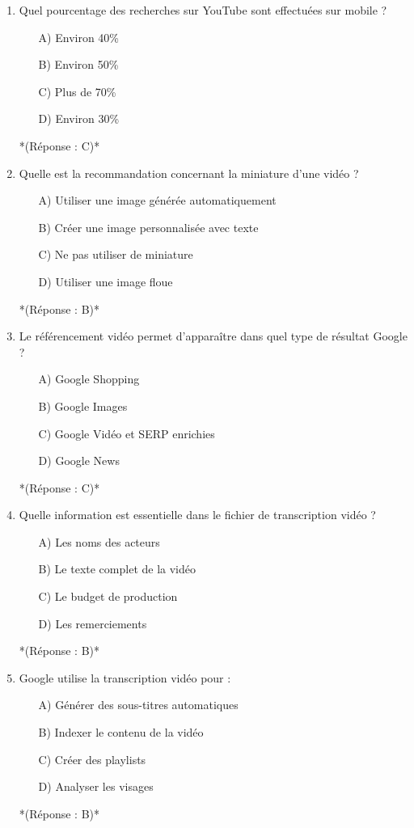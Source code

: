 \documentclass[12pt,a4paper,twoside]{report}
\begin{document}
\begin{enumerate}
    \item Quel pourcentage des recherches sur YouTube sont effectuées sur mobile ?
    \begin{itemize}
        \item[A)] Environ 40\%
        \item[B)] Environ 50\%
        \item[C)] Plus de 70\%
        \item[D)] Environ 30\%
    \end{itemize}
    *(Réponse : C)*

    \item Quelle est la recommandation concernant la miniature d'une vidéo ?
    \begin{itemize}
        \item[A)] Utiliser une image générée automatiquement
        \item[B)] Créer une image personnalisée avec texte
        \item[C)] Ne pas utiliser de miniature
        \item[D)] Utiliser une image floue
    \end{itemize}
    *(Réponse : B)*

    \item Le référencement vidéo permet d'apparaître dans quel type de résultat Google ?
    \begin{itemize}
        \item[A)] Google Shopping
        \item[B)] Google Images
        \item[C)] Google Vidéo et SERP enrichies
        \item[D)] Google News
    \end{itemize}
    *(Réponse : C)*

    \item Quelle information est essentielle dans le fichier de transcription vidéo ?
    \begin{itemize}
        \item[A)] Les noms des acteurs
        \item[B)] Le texte complet de la vidéo
        \item[C)] Le budget de production
        \item[D)] Les remerciements
    \end{itemize}
    *(Réponse : B)*

    \item Google utilise la transcription vidéo pour :
    \begin{itemize}
        \item[A)] Générer des sous-titres automatiques
        \item[B)] Indexer le contenu de la vidéo
        \item[C)] Créer des playlists
        \item[D)] Analyser les visages
    \end{itemize}
    *(Réponse : B)*


\end{enumerate}
\end{document}

